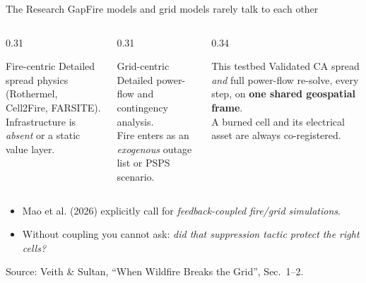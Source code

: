 \documentclass[aspectratio=169,9pt]{beamer}
\newcommand{\gold}[1]{{\color{cslaeaglegold}\textbf{#1}}}
\newcommand{\srcnote}[1]{\vfill{\scriptsize\color{csladarkgray}#1}}
\begin{document}
\begin{frame}{The Research Gap}{Fire models and grid models rarely talk to each other}
  \begin{columns}[T,onlytextwidth]
    \begin{column}{0.31\textwidth}
      \begin{block}{Fire-centric}
        \small
        Detailed spread physics (Rothermel, Cell2Fire, FARSITE).\\[4pt]
        Infrastructure is \emph{absent} or a static value layer.
      \end{block}
    \end{column}
    \begin{column}{0.31\textwidth}
      \begin{block}{Grid-centric}
        \small
        Detailed power-flow and contingency analysis.\\[4pt]
        Fire enters as an \emph{exogenous} outage list or PSPS scenario.
      \end{block}
    \end{column}
    \begin{column}{0.34\textwidth}
      \begin{alertblock}{This testbed}
        \small
        Validated CA spread \emph{and} full power-flow re-solve, every step,
        on \gold{one shared geospatial frame}.\\[4pt]
        A burned cell and its electrical asset are always co-registered.
      \end{alertblock}
    \end{column}
  \end{columns}
  \vskip6pt
  \begin{itemize}
    \item Mao et al. (2026) explicitly call for \emph{feedback-coupled
          fire/grid simulations}.
    \item Without coupling you cannot ask: \emph{did that suppression tactic
          protect the right cells?}
  \end{itemize}
  \srcnote{Source: Veith \& Sultan, ``When Wildfire Breaks the Grid'', Sec.~1--2.}
\end{frame}
\end{document}
